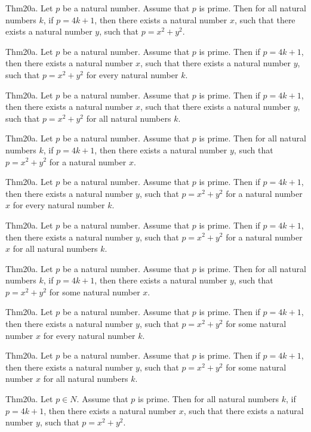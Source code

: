 \documentclass{article}
\begin{document}
Thm20a. Let $p$ be a natural number. Assume that $p$ is prime. Then for all natural numbers $k$, if $p = 4 k + 1$, then there exists a natural number $x$, such that there exists a natural number $y$, such that $p = x ^{ 2}+ y ^{ 2}$.

Thm20a. Let $p$ be a natural number. Assume that $p$ is prime. Then if $p = 4 k + 1$, then there exists a natural number $x$, such that there exists a natural number $y$, such that $p = x ^{ 2}+ y ^{ 2}$ for every natural number $k$.

Thm20a. Let $p$ be a natural number. Assume that $p$ is prime. Then if $p = 4 k + 1$, then there exists a natural number $x$, such that there exists a natural number $y$, such that $p = x ^{ 2}+ y ^{ 2}$ for all natural numbers $k$.

Thm20a. Let $p$ be a natural number. Assume that $p$ is prime. Then for all natural numbers $k$, if $p = 4 k + 1$, then there exists a natural number $y$, such that $p = x ^{ 2}+ y ^{ 2}$ for a natural number $x$.

Thm20a. Let $p$ be a natural number. Assume that $p$ is prime. Then if $p = 4 k + 1$, then there exists a natural number $y$, such that $p = x ^{ 2}+ y ^{ 2}$ for a natural number $x$ for every natural number $k$.

Thm20a. Let $p$ be a natural number. Assume that $p$ is prime. Then if $p = 4 k + 1$, then there exists a natural number $y$, such that $p = x ^{ 2}+ y ^{ 2}$ for a natural number $x$ for all natural numbers $k$.

Thm20a. Let $p$ be a natural number. Assume that $p$ is prime. Then for all natural numbers $k$, if $p = 4 k + 1$, then there exists a natural number $y$, such that $p = x ^{ 2}+ y ^{ 2}$ for some natural number $x$.

Thm20a. Let $p$ be a natural number. Assume that $p$ is prime. Then if $p = 4 k + 1$, then there exists a natural number $y$, such that $p = x ^{ 2}+ y ^{ 2}$ for some natural number $x$ for every natural number $k$.

Thm20a. Let $p$ be a natural number. Assume that $p$ is prime. Then if $p = 4 k + 1$, then there exists a natural number $y$, such that $p = x ^{ 2}+ y ^{ 2}$ for some natural number $x$ for all natural numbers $k$.

Thm20a. Let $p \in N$. Assume that $p$ is prime. Then for all natural numbers $k$, if $p = 4 k + 1$, then there exists a natural number $x$, such that there exists a natural number $y$, such that $p = x ^{ 2}+ y ^{ 2}$.
\end{document}
